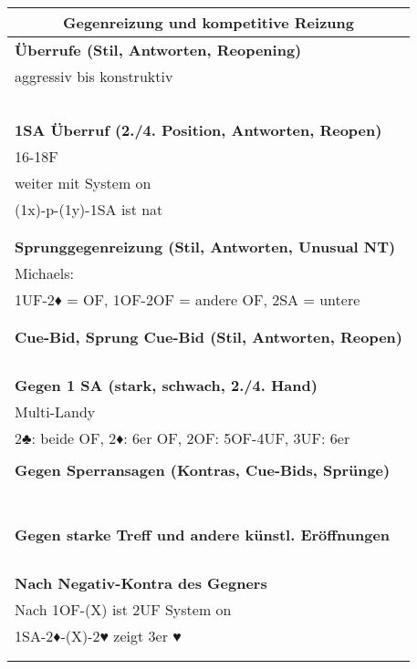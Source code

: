 \documentclass{article}
\begin{document}
\begin{multicols}{3}
\raggedcolumns

\begin{tabularx}{\columnwidth}{|X|}
\hline \multicolumn{1}{c}{\bf \large Gegenreizung und kompetitive Reizung} \\
\hline \bf Überrufe (Stil, Antworten, Reopening) \\
 aggressiv bis konstruktiv \\
\\
\\
\\
\\
\\
\hline \bf 1SA Überruf (2./4. Position, Antworten, Reopen) \\
 16-18F \\
 weiter mit System on \\
 (1x)-p-(1y)-1SA ist nat \\
\\
\\
\hline \bf Sprunggegenreizung (Stil, Antworten, Unusual NT) \\
 Michaels: \\
 1UF-2♦ = OF, 1OF-2OF = andere OF, 2SA = untere \\
\\
\\
\hline \bf Cue-Bid, Sprung Cue-Bid (Stil, Antworten, Reopen) \\
\\
\\
\\
\\
\hline \bf Gegen 1 SA (stark, schwach, 2./4. Hand) \\
 Multi-Landy \\
 2♣: beide OF, 2♦: 6er OF, 2OF: 5OF-4UF, 3UF: 6er \\
\\
\hline \bf Gegen Sperransagen (Kontras, Cue-Bids, Sprünge) \\
\\
\\
\\
\\
\\
\\
\\
\hline \bf Gegen starke Treff und andere künstl. Eröffnungen \\
\\
\\
\\
\\
\hline \bf Nach Negativ-Kontra des Gegners \\
 Nach 1OF-(X) ist 2UF System on \\
 1SA-2♦-(X)-2♥ zeigt 3er ♥ \\
\\
\\
\hline \end{tabularx}


\end{multicols}
\end{document}
